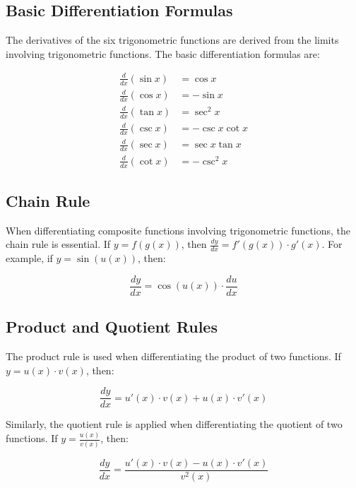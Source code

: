 \documentclass[a4paper,12pt]{book}
\newcounter{example}
\begin{document}
\subsection*{Basic Differentiation Formulas}

The derivatives of the six trigonometric functions are derived from the limits involving trigonometric functions. The basic differentiation formulas are:

\begin{align}
\frac{d}{dx} (\sin x) &= \cos x \\
\frac{d}{dx} (\cos x) &= -\sin x \\
\frac{d}{dx} (\tan x) &= \sec^2 x \\
\frac{d}{dx} (\csc x) &= -\csc x \cot x \\
\frac{d}{dx} (\sec x) &= \sec x \tan x \\
\frac{d}{dx} (\cot x) &= -\csc^2 x
\end{align}

\subsection*{Chain Rule}

When differentiating composite functions involving trigonometric functions, the chain rule is essential. If \(y = f(g(x))\), then \(\frac{dy}{dx} = f'(g(x)) \cdot g'(x)\). For example, if \(y = \sin(u(x))\), then:

\begin{equation}
\frac{dy}{dx} = \cos(u(x)) \cdot \frac{du}{dx}
\end{equation}

\subsection*{Product and Quotient Rules}

The product rule is used when differentiating the product of two functions. If \(y = u(x) \cdot v(x)\), then:

\begin{equation}
\frac{dy}{dx} = u'(x) \cdot v(x) + u(x) \cdot v'(x)
\end{equation}

Similarly, the quotient rule is applied when differentiating the quotient of two functions. If \(y = \frac{u(x)}{v(x)}\), then:

\begin{equation}
\frac{dy}{dx} = \frac{u'(x) \cdot v(x) - u(x) \cdot v'(x)}{v^2(x)}
\end{equation}
\end{document}
